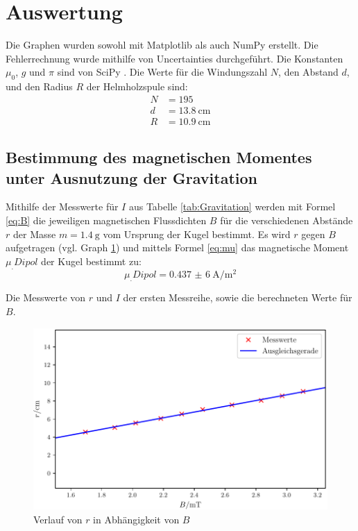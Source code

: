 \section{Auswertung}
\label{sec:Auswertung}

Die Graphen wurden sowohl mit Matplotlib \cite{matplotlib} als auch NumPy \cite{numpy} erstellt. 
Die Fehlerrechnung wurde mithilfe von Uncertainties \cite{uncertainties} durchgeführt.
Die Konstanten $\mu_0$, $g$ und $\pi$ sind von SciPy \cite{scipy}.
Die Werte für die Windungszahl $N$, den Abstand $d$, und den Radius $R$ der Helmholzspule sind:
\begin{align*}
N &= 195\\
d &= \SI{13,8}{\centi\metre}\\
R &= \SI{10,9}{\centi\metre}
\end{align*}

\subsection{Bestimmung des magnetischen Momentes unter Ausnutzung der Gravitation}

Mithilfe der Messwerte für $I$ aus Tabelle \ref{tab:Gravitation} werden mit Formel \eqref{eq:B} die jeweiligen magnetischen Flussdichten $B$ für die verschiedenen Abstände $r$ der Masse $m=\SI{1,4}{\gram}$ vom Ursprung der Kugel bestimmt. Es wird $r$ gegen $B$ aufgetragen (vgl. Graph \ref{fig:Gravitation}) und mittels Formel \eqref{eq:mu} das magnetische Moment $\mu_.{Dipol}$ der Kugel bestimmt zu:
\begin{equation*}
\mu_.{Dipol} = \SI{0,437(6)}{\ampere\per\metre\squared}
\end{equation*}  
\begin{table}
  	\centering
  	\caption{Die Messwerte von $r$ und $I$ der ersten Messreihe, sowie die berechneten Werte für $B$.}
  	\label{tab:Gravitation}
\end{table}
\begin{figure}
	\centering
	\includegraphics[scale = 1,keepaspectratio]
	{content/images/Gravitation.pdf}
	\caption{Verlauf von $r$ in Abhängigkeit von $B$}
	\label{fig:Gravitation}
\end{figure}

